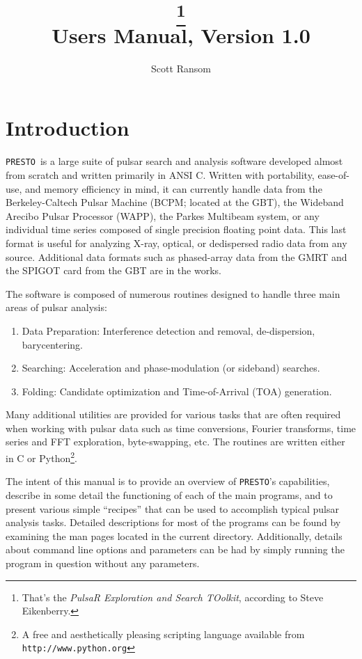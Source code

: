 \documentclass[11pt]{article}
\title{\huge \PRESTO\thanks{That's the \emph{PulsaR Exploration and
      Search TOolkit},
    according to Steve Eikenberry.}\\
  {\large Users Manual, Version 1.0}}
\author{Scott Ransom}
\newcommand{\PRESTO}{{\tt PRESTO}}
\begin{document}
\maketitle

\section{Introduction}

\PRESTO\ is a large suite of pulsar search and analysis software
developed almost from scratch and written primarily in ANSI C.
Written with portability, ease-of-use, and memory efficiency in mind,
it can currently handle data from the Berkeley-Caltech Pulsar Machine
(BCPM; located at the GBT), the Wideband Arecibo Pulsar
Processor (WAPP), the Parkes Multibeam system, or any individual time
series composed of single precision floating point data.  This last
format is useful for analyzing X-ray, optical, or dedispersed radio
data from any source.  Additional data formats such as phased-array
data from the GMRT and the SPIGOT card from the GBT are in the works.

The software is composed of numerous routines designed to handle three
main areas of pulsar analysis:
\begin{enumerate}
\item Data Preparation: Interference detection and removal,
  de-dispersion, barycentering.
\item Searching: Acceleration and phase-modulation (or sideband)
  searches.
\item Folding: Candidate optimization and Time-of-Arrival (TOA)
  generation.
\end{enumerate}
Many additional utilities are provided for various tasks that are
often required when working with pulsar data such as time conversions,
Fourier transforms, time series and FFT exploration, byte-swapping,
etc.  The routines are written either in C or Python\footnote{A free
  and aesthetically pleasing scripting language available from {\tt
    http://www.python.org}}.

The intent of this manual is to provide an overview of \PRESTO's
capabilities, describe in some detail the functioning of each of the
main programs, and to present various simple ``recipes'' that can be
used to accomplish typical pulsar analysis tasks.  Detailed
descriptions for most of the programs can be found by examining the
man pages located in the current directory.  Additionally, details
about command line options and parameters can be had by simply running
the program in question without any parameters.
\end{document}
